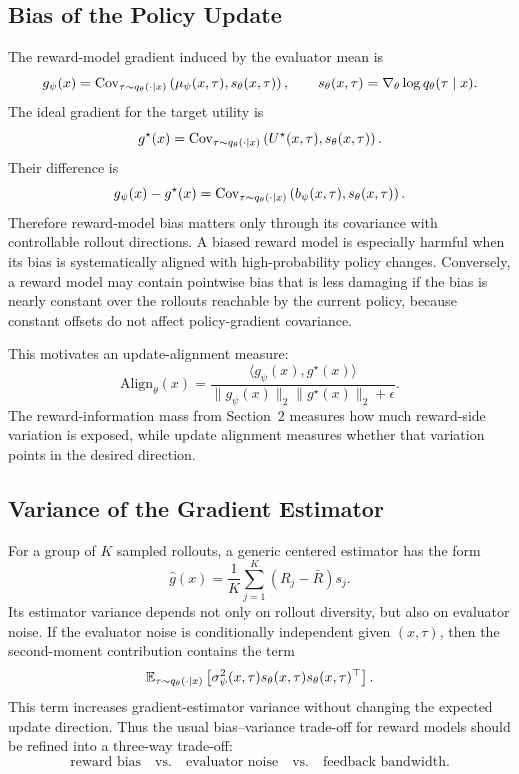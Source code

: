\subsection{Bias of the Policy Update}

The reward-model gradient induced by the evaluator mean is
\[
  g_\psi(x)
  =
  \mathrm{Cov}_{\tau\sim q_\theta(\cdot\mid x)}
  \left(
    \mu_\psi(x,\tau),
    s_\theta(x,\tau)
  \right),
  \qquad
  s_\theta(x,\tau)=\nabla_\theta \log q_\theta(\tau\mid x).
\]
The ideal gradient for the target utility is
\[
  g^\star(x)
  =
  \mathrm{Cov}_{\tau\sim q_\theta(\cdot\mid x)}
  \left(
    U^\star(x,\tau),
    s_\theta(x,\tau)
  \right).
\]
Their difference is
\[
  g_\psi(x)-g^\star(x)
  =
  \mathrm{Cov}_{\tau\sim q_\theta(\cdot\mid x)}
  \left(
    b_\psi(x,\tau),
    s_\theta(x,\tau)
  \right).
\]
Therefore reward-model bias matters only through its covariance with controllable rollout directions. A biased reward model is especially harmful when its bias is systematically aligned with high-probability policy changes. Conversely, a reward model may contain pointwise bias that is less damaging if the bias is nearly constant over the rollouts reachable by the current policy, because constant offsets do not affect policy-gradient covariance.

This motivates an update-alignment measure:
\[
  \mathrm{Align}_\theta(x)
  =
  \frac{
    \langle g_\psi(x),g^\star(x)\rangle
  }{
    \|g_\psi(x)\|_2\|g^\star(x)\|_2+\epsilon
  }.
\]
The reward-information mass from Section~2 measures how much reward-side variation is exposed, while update alignment measures whether that variation points in the desired direction.

\subsection{Variance of the Gradient Estimator}

For a group of $K$ sampled rollouts, a generic centered estimator has the form
\[
  \widehat g(x)
  =
  \frac{1}{K}\sum_{j=1}^K
  (R_j-\bar R)s_j.
\]
Its estimator variance depends not only on rollout diversity, but also on evaluator noise. If the evaluator noise is conditionally independent given $(x,\tau)$, then the second-moment contribution contains the term
\[
  \mathbb{E}_{\tau\sim q_\theta(\cdot\mid x)}
  \left[
    \sigma_\psi^2(x,\tau)
    s_\theta(x,\tau)s_\theta(x,\tau)^\top
  \right].
\]
This term increases gradient-estimator variance without changing the expected update direction. Thus the usual bias--variance trade-off for reward models should be refined into a three-way trade-off:
\[
  \text{reward bias}
  \quad
  \text{vs.}
  \quad
  \text{evaluator noise}
  \quad
  \text{vs.}
  \quad
  \text{feedback bandwidth}.
\]

